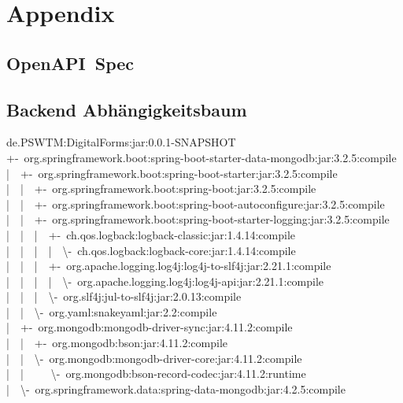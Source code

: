 \chapter{Appendix}\label{ch:appendix}

\section{OpenAPI~Spec}\label{sec:openapi-spec}




\section{Backend Abhängigkeitsbaum}\label{sec:backend-abhangigkeitsbaum}
de.PSWTM:DigitalForms:jar:0.0.1-SNAPSHOT\\
+-~org.springframework.boot:spring-boot-starter-data-mongodb:jar:3.2.5:compile\\
|~~+-~org.springframework.boot:spring-boot-starter:jar:3.2.5:compile\\
|~~|~~+-~org.springframework.boot:spring-boot:jar:3.2.5:compile\\
|~~|~~+-~org.springframework.boot:spring-boot-autoconfigure:jar:3.2.5:compile\\
|~~|~~+-~org.springframework.boot:spring-boot-starter-logging:jar:3.2.5:compile\\
|~~|~~|~~+-~ch.qos.logback:logback-classic:jar:1.4.14:compile\\
|~~|~~|~~|~~\textbackslash-~ch.qos.logback:logback-core:jar:1.4.14:compile\\
|~~|~~|~~+-~org.apache.logging.log4j:log4j-to-slf4j:jar:2.21.1:compile\\
|~~|~~|~~|~~\textbackslash-~org.apache.logging.log4j:log4j-api:jar:2.21.1:compile\\
|~~|~~|~~\textbackslash-~org.slf4j:jul-to-slf4j:jar:2.0.13:compile\\
|~~|~~\textbackslash-~org.yaml:snakeyaml:jar:2.2:compile\\
|~~+-~org.mongodb:mongodb-driver-sync:jar:4.11.2:compile\\
|~~|~~+-~org.mongodb:bson:jar:4.11.2:compile\\
|~~|~~\textbackslash-~org.mongodb:mongodb-driver-core:jar:4.11.2:compile\\
|~~|~~~~~\textbackslash-~org.mongodb:bson-record-codec:jar:4.11.2:runtime\\
|~~\textbackslash-~org.springframework.data:spring-data-mongodb:jar:4.2.5:compile\\
